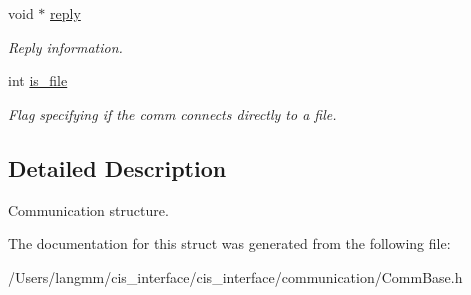 \begin{DoxyCompactItemize}
\mbox{\label{structcomm__t_a05095fa4451ed9085e2d23bb5304df10}} 
void $\ast$ \mbox{\hyperlink{structcomm__t_a05095fa4451ed9085e2d23bb5304df10}{reply}}
\begin{DoxyCompactList}\small\item\em Reply information. \end{DoxyCompactList}\item 
\mbox{\label{structcomm__t_a2d004dd7203d970ac2f398a25276ad2f}} 
int \mbox{\hyperlink{structcomm__t_a2d004dd7203d970ac2f398a25276ad2f}{is\+\_\+file}}
\begin{DoxyCompactList}\small\item\em Flag specifying if the comm connects directly to a file. \end{DoxyCompactList}\end{DoxyCompactItemize}


\subsection{Detailed Description}
Communication structure. 

The documentation for this struct was generated from the following file\+:\begin{DoxyCompactItemize}
\item 
/\+Users/langmm/cis\+\_\+interface/cis\+\_\+interface/communication/Comm\+Base.\+h\end{DoxyCompactItemize}
